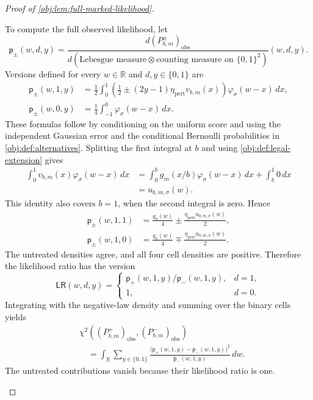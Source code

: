 \begin{proof}[Proof of \cref{obj:lem:full-marked-likelihood}]
\begin{enumerate}
To compute the full observed likelihood, let
\[
\mathsf p_\pm(w,d,y)
=
\frac{d(P^\pm_{b,m})_{\mathrm{obs}}}
     {d(\text{Lebesgue measure}\otimes\text{counting measure on }\{0,1\}^2)}
     (w,d,y).
\]
Versions defined for every \(w\in\mathbb R\) and \(d,y\in\{0,1\}\) are
\[
\begin{aligned}
\mathsf p_\pm(w,1,y)
&=\frac12\int_0^1
 \left(\frac12\pm(2y-1)\eta_{\mathrm{pert}}v_{b,m}(x)\right)
 \varphi_\sigma(w-x)\,dx,\\
\mathsf p_\pm(w,0,y)
&=\frac14\int_{-1}^0\varphi_\sigma(w-x)\,dx.
\end{aligned}
\]
These formulas follow by conditioning on the uniform score and using the independent Gaussian error and the conditional Bernoulli probabilities in \cref{obj:def:alternatives}. Splitting the first integral at \(b\) and using \cref{obj:def:legal-extension} gives
\[
\begin{aligned}
\int_0^1v_{b,m}(x)\varphi_\sigma(w-x)\,dx
&=\int_0^bg_m(x/b)\varphi_\sigma(w-x)\,dx
  +\int_b^1 0\,dx\\
&=u_{b,m,\sigma}(w).
\end{aligned}
\]
This identity also covers \(b=1\), when the second integral is zero. Hence
\[
\begin{aligned}
\mathsf p_\pm(w,1,1)
&=\frac{q_\sigma(w)}4
  \pm\frac{\eta_{\mathrm{pert}}u_{b,m,\sigma}(w)}2,\\
\mathsf p_\pm(w,1,0)
&=\frac{q_\sigma(w)}4
  \mp\frac{\eta_{\mathrm{pert}}u_{b,m,\sigma}(w)}2.
\end{aligned}
\]
The untreated densities agree, and all four cell densities are positive. Therefore the likelihood ratio has the version
\[
\mathsf{LR}(w,d,y)
=
\begin{cases}
\mathsf p_+(w,1,y)/\mathsf p_-(w,1,y),&d=1,\\
1,&d=0.
\end{cases}
\]
Integrating with the negative-law density and summing over the binary cells yields
\[
\begin{aligned}
&\chi^2\!\left((P^+_{b,m})_{\mathrm{obs}},
              (P^-_{b,m})_{\mathrm{obs}}\right)\\
&\quad=
\int_{\mathbb R}\sum_{y\in\{0,1\}}
\frac{\bigl(\mathsf p_+(w,1,y)-\mathsf p_-(w,1,y)\bigr)^2}
     {\mathsf p_-(w,1,y)}\,dw.
\end{aligned}
\]
The untreated contributions vanish because their likelihood ratio is one.


\end{enumerate}
\end{proof}
